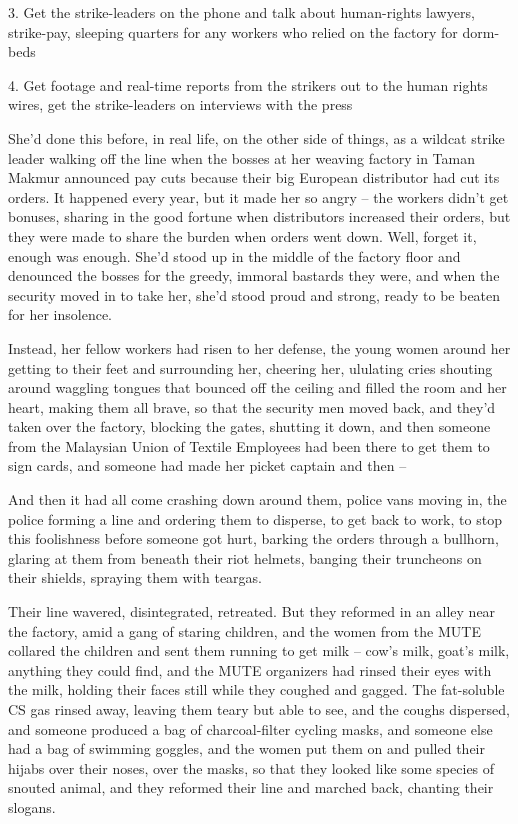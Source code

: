 3. Get the strike-leaders on the phone and talk about human-rights
lawyers, strike-pay, sleeping quarters for any workers who relied
on the factory for dorm-beds

4. Get footage and real-time reports from the strikers out to the
human rights wires, get the strike-leaders on interviews with the
press

She'd done this before, in real life, on the other side of things,
as a wildcat strike leader walking off the line when the bosses at
her weaving factory in Taman Makmur announced pay cuts because
their big European distributor had cut its orders. It happened
every year, but it made her so angry -- the workers didn't get
bonuses, sharing in the good fortune when distributors increased
their orders, but they were made to share the burden when orders
went down. Well, forget it, enough was enough. She'd stood up in
the middle of the factory floor and denounced the bosses for the
greedy, immoral bastards they were, and when the security moved in
to take her, she'd stood proud and strong, ready to be beaten for
her insolence.

Instead, her fellow workers had risen to her defense, the young
women around her getting to their feet and surrounding her,
cheering her, ululating cries shouting around waggling tongues that
bounced off the ceiling and filled the room and her heart, making
them all brave, so that the security men moved back, and they'd
taken over the factory, blocking the gates, shutting it down, and
then someone from the Malaysian Union of Textile Employees had been
there to get them to sign cards, and someone had made her picket
captain and then --

And then it had all come crashing down around them, police vans
moving in, the police forming a line and ordering them to disperse,
to get back to work, to stop this foolishness before someone got
hurt, barking the orders through a bullhorn, glaring at them from
beneath their riot helmets, banging their truncheons on their
shields, spraying them with teargas.

Their line wavered, disintegrated, retreated. But they reformed in
an alley near the factory, amid a gang of staring children, and the
women from the MUTE collared the children and sent them running to
get milk -- cow's milk, goat's milk, anything they could find, and
the MUTE organizers had rinsed their eyes with the milk, holding
their faces still while they coughed and gagged. The fat-soluble CS
gas rinsed away, leaving them teary but able to see, and the coughs
dispersed, and someone produced a bag of charcoal-filter cycling
masks, and someone else had a bag of swimming goggles, and the
women put them on and pulled their hijabs over their noses, over
the masks, so that they looked like some species of snouted animal,
and they reformed their line and marched back, chanting their
slogans.

